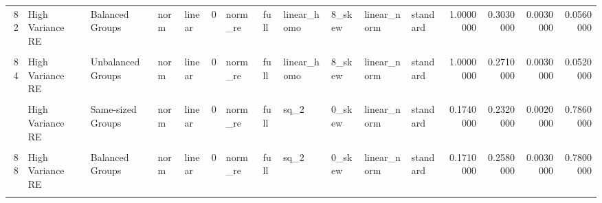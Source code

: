 \documentclass[12pt]{article}
\begin{document}
\begin{table}
{\begin{tabular}[t]{rllllrllllllrrrr}
82 & High Variance RE & Balanced Groups & norm & linear & 0 & norm\_re & full & linear\_homo & 8\_skew & linear\_norm & standard & 1.0000000 & 0.3030000 & 0.0030000 & 0.0560000\\
\cellcolor{gray!6}{83} & \cellcolor{gray!6}{High Variance Error} & \cellcolor{gray!6}{Unbalanced Groups} & \cellcolor{gray!6}{norm} & \cellcolor{gray!6}{linear} & \cellcolor{gray!6}{0} & \cellcolor{gray!6}{norm\_re} & \cellcolor{gray!6}{full} & \cellcolor{gray!6}{linear\_homo} & \cellcolor{gray!6}{8\_skew} & \cellcolor{gray!6}{linear\_norm} & \cellcolor{gray!6}{standard} & \cellcolor{gray!6}{1.0000000} & \cellcolor{gray!6}{0.5170000} & \cellcolor{gray!6}{0.8020000} & \cellcolor{gray!6}{0.0520000}\\
84 & High Variance RE & Unbalanced Groups & norm & linear & 0 & norm\_re & full & linear\_homo & 8\_skew & linear\_norm & standard & 1.0000000 & 0.2710000 & 0.0030000 & 0.0520000\\
\cellcolor{gray!6}{85} & \cellcolor{gray!6}{High Variance Error} & \cellcolor{gray!6}{Same-sized Groups} & \cellcolor{gray!6}{norm} & \cellcolor{gray!6}{linear} & \cellcolor{gray!6}{0} & \cellcolor{gray!6}{norm\_re} & \cellcolor{gray!6}{full} & \cellcolor{gray!6}{sq\_2} & \cellcolor{gray!6}{0\_skew} & \cellcolor{gray!6}{linear\_norm} & \cellcolor{gray!6}{standard} & \cellcolor{gray!6}{0.0490000} & \cellcolor{gray!6}{0.1780000} & \cellcolor{gray!6}{0.2170000} & \cellcolor{gray!6}{0.4470000}\\
\addlinespace
86 & High Variance RE & Same-sized Groups & norm & linear & 0 & norm\_re & full & sq\_2 & 0\_skew & linear\_norm & standard & 0.1740000 & 0.2320000 & 0.0020000 & 0.7860000\\
\cellcolor{gray!6}{87} & \cellcolor{gray!6}{High Variance Error} & \cellcolor{gray!6}{Balanced Groups} & \cellcolor{gray!6}{norm} & \cellcolor{gray!6}{linear} & \cellcolor{gray!6}{0} & \cellcolor{gray!6}{norm\_re} & \cellcolor{gray!6}{full} & \cellcolor{gray!6}{sq\_2} & \cellcolor{gray!6}{0\_skew} & \cellcolor{gray!6}{linear\_norm} & \cellcolor{gray!6}{standard} & \cellcolor{gray!6}{0.0480000} & \cellcolor{gray!6}{0.1570000} & \cellcolor{gray!6}{0.1870000} & \cellcolor{gray!6}{0.4390000}\\
88 & High Variance RE & Balanced Groups & norm & linear & 0 & norm\_re & full & sq\_2 & 0\_skew & linear\_norm & standard & 0.1710000 & 0.2580000 & 0.0030000 & 0.7800000\\
\cellcolor{gray!6}{89} & \cellcolor{gray!6}{High Variance Error} & \cellcolor{gray!6}{Unbalanced Groups} & \cellcolor{gray!6}{norm} & \cellcolor{gray!6}{linear} & \cellcolor{gray!6}{0} & \cellcolor{gray!6}{norm\_re} & \cellcolor{gray!6}{full} & \cellcolor{gray!6}{sq\_2} & \cellcolor{gray!6}{0\_skew} & \cellcolor{gray!6}{linear\_norm} & \cellcolor{gray!6}{standard} & \cellcolor{gray!6}{0.0500000} & \cellcolor{gray!6}{0.1810000} & \cellcolor{gray!6}{0.1680000} & \cellcolor{gray!6}{0.4570000}\\

\end{tabular}}
\end{table}
\end{document}
